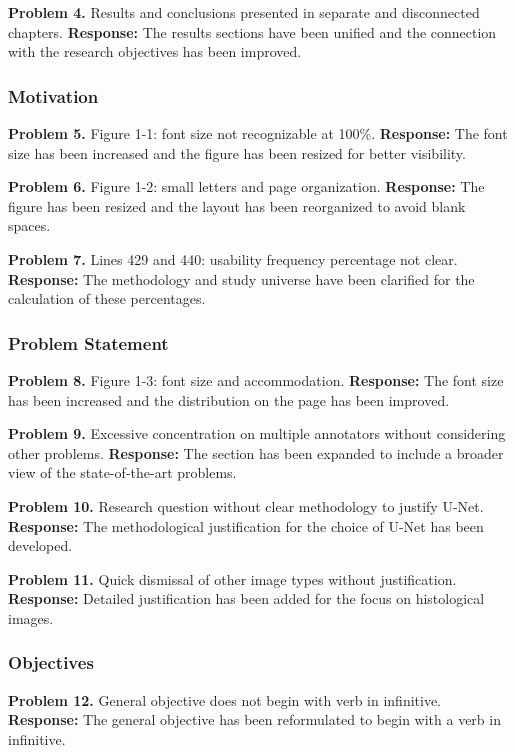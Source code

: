 \documentclass[12pt,a4paper]{article}
\begin{document}
\textbf{Problem 4.} Results and conclusions presented in
separate and disconnected chapters.
\textbf{Response:} The results sections have been unified and
the connection with the research objectives has been improved.

\subsubsection*{Motivation}

\textbf{Problem 5.} Figure 1-1: font size not recognizable at 100\%.
\textbf{Response:} The font size has been increased and
the figure has been resized for better visibility.

\textbf{Problem 6.} Figure 1-2: small letters and page organization.
\textbf{Response:} The figure has been resized and the
layout has been reorganized to avoid blank spaces.

\textbf{Problem 7.} Lines 429 and 440: usability frequency percentage not clear.
\textbf{Response:} The methodology and study universe have been
clarified for the calculation of these percentages.

\subsubsection*{Problem Statement}

\textbf{Problem 8.} Figure 1-3: font size and accommodation.
\textbf{Response:} The font size has been increased and the
distribution on the page has been improved.

\textbf{Problem 9.} Excessive concentration on multiple annotators
without considering other problems.
\textbf{Response:} The section has been expanded to include a
broader view of the state-of-the-art problems.

\textbf{Problem 10.} Research question without clear methodology
to justify U-Net.
\textbf{Response:} The methodological justification
for the choice of U-Net has been developed.

\textbf{Problem 11.} Quick dismissal of other image types without
justification.
\textbf{Response:} Detailed justification has been added for the
focus on histological images.

\subsubsection*{Objectives}

\textbf{Problem 12.} General objective does not begin with verb in infinitive.
\textbf{Response:} The general objective has been reformulated to
begin with a verb in infinitive.
\end{document}
